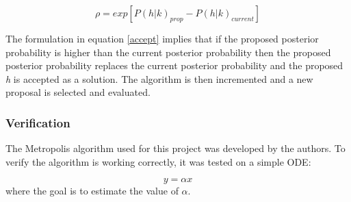 \begin{equation}\label{accept}
\rho = exp[P(h|%
k)_{prop} - P(h|%
k)_{current}]
\end{equation}

The formulation in equation \ref{accept} implies that if the proposed posterior probability is higher than the current posterior probability then the proposed posterior probability replaces the current posterior probability and the proposed \textit{h} is accepted as a solution. The algorithm is then incremented and a new proposal is selected and evaluated. 


\subsubsection{Verification}
The Metropolis algorithm used for this project was developed by the authors. To verify the algorithm is working correctly, it was tested on a simple ODE:

\begin{equation}
y = \alpha x 
\end{equation}
where the goal is to estimate the value of $\alpha$. 














